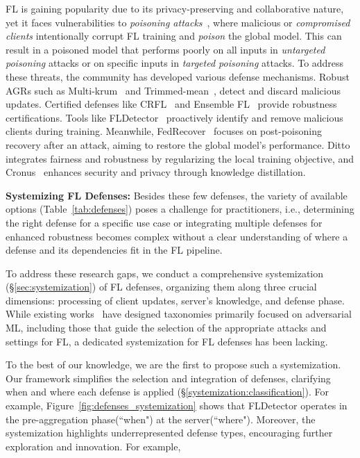 FL is gaining popularity due to its privacy-preserving and collaborative nature, yet it faces vulnerabilities to \emph{poisoning attacks}~\cite{fang2020local, shejwalkar2021manipulating, shejwalkar2022back, wang2020attack}, where malicious or \emph{compromised clients} intentionally corrupt FL training and \emph{poison} the global model. This can result in a poisoned model that performs poorly on all inputs in \emph{untargeted poisoning} attacks or on specific inputs in \emph{targeted poisoning} attacks. To address these threats, the community has developed various defense mechanisms. Robust AGRs such as Multi-krum~\cite{blanchard2017machine} and Trimmed-mean~\cite{yin2018byzantine}, detect and discard malicious updates. Certified defenses like CRFL~\cite{xie2021crfl} and Ensemble FL~\cite{cao2021provably} provide robustness certifications. Tools like FLDetector~\cite{zhang2022fldetector} proactively identify and remove malicious clients during training. Meanwhile, FedRecover~\cite{cao2022fedrecover} focuses on post-poisoning recovery after an attack, aiming to restore the global model's performance. Ditto~\cite{li2021ditto} integrates fairness and robustness by regularizing the local training objective, and Cronus~\cite{chang2019cronus} enhances security and privacy through knowledge distillation.

\noindent\textbf{Systemizing FL Defenses:}
Besides these few defenses, the variety of available options (Table~\ref{tab:defenses}) poses a challenge for practitioners, i.e., determining the right defense for a specific use case or integrating multiple defenses for enhanced robustness becomes complex without a clear understanding of where a defense and its dependencies fit in the FL pipeline.

To address these research gaps, we conduct a comprehensive systemization (\S\ref{sec:systemization}) of FL defenses, organizing them along three crucial dimensions: processing of client updates, server's knowledge, and defense phase.
While existing works~\cite{shejwalkar2022back, jere2020taxonomy, barreno2010the, biggio2018wild, huang2011adversarial, rodriguez2023survey} have designed taxonomies primarily focused on adversarial ML, including those that guide the selection of the appropriate attacks and settings for FL, a dedicated systemization for FL defenses has been lacking.

To the best of our knowledge, we are the first to propose such a systemization.
Our framework simplifies the selection and integration of defenses, clarifying when and where each defense is applied (\S\ref{systemization:classification}). For example, Figure~\ref{fig:defenses_systemization} shows that FLDetector operates in the pre-aggregation phase(``when") at the server(``where"). Moreover, the systemization highlights underrepresented defense types, encouraging further exploration and innovation. 
For example, 

